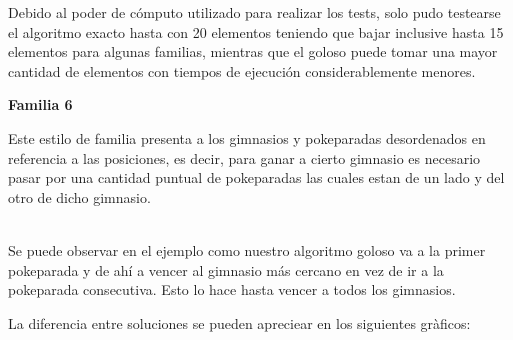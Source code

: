 Debido al poder de cómputo utilizado para realizar los tests, solo pudo testearse el algoritmo exacto hasta con 20 elementos teniendo que bajar inclusive hasta 15 elementos para algunas familias, mientras que el goloso puede tomar una mayor cantidad de elementos con tiempos de ejecución considerablemente menores.

\begin{center}
\textbf{Familia 6}
\end{center}

Este estilo de familia presenta a los gimnasios y pokeparadas desordenados en referencia a las posiciones, es decir, para ganar a cierto gimnasio es necesario pasar por una cantidad puntual de pokeparadas las cuales estan de un lado y del otro de dicho gimnasio.
\\\\

  \begin{figure} [h]
 \centering
    \end{figure} 

Se puede observar en el ejemplo como nuestro algoritmo goloso va a la primer pokeparada y de ah\'i a vencer al gimnasio m\'as cercano en vez de ir a la pokeparada consecutiva. Esto lo hace hasta vencer a todos los gimnasios.

La diferencia entre soluciones se pueden apreciear en los siguientes gràficos:\\

